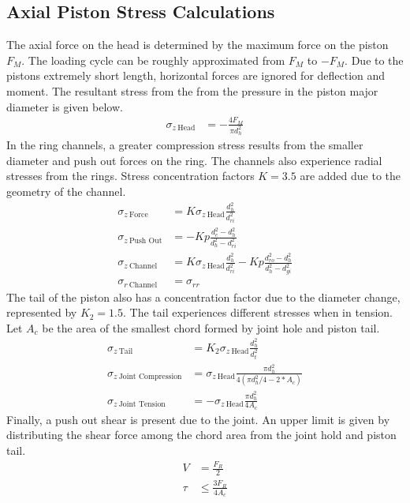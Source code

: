 \documentclass[10pt,a4paper]{article}
\begin{document}
	\subsection*{Axial Piston Stress Calculations}
	The axial force on the head is determined by the maximum force on the piston $F_M$. The loading cycle can be roughly approximated from $F_M$ to $-F_M$. Due to the pistons extremely short length, horizontal forces are ignored for deflection and moment. The resultant stress from the from the pressure in the piston major diameter is given below.
	\begin{align*}
		\sigma_{z\ \text{Head}} &= - \frac{4 F_M}{\pi d_h^2}
	\end{align*}
	In the ring channels, a greater compression stress results from the smaller diameter and push out forces on the ring. The channels also experience radial stresses from the rings. Stress concentration factors $K = 3.5$ are added due to the geometry of the channel.
	\begin{align*}
		\sigma_{z\ \text{Force}} &=  K \sigma_{z\ \text{Head}} \frac{d_h^2}{d_{ri}^2} \\
		\sigma_{z\ \text{Push Out}} &= - K p \frac{d_{c}^2 - d_h^2}{d_h^2 - d_{ri}^2}\\
		\sigma_{z\ \text{Channel}} &= K \sigma_{z\ \text{Head}} \frac{d_h^2}{d_{ri}^2} - K p \frac{d_{ro}^2 - d_h^2}{d_h^2 - d_{gi}^2}\\
		\sigma_{r\ \text{Channel}} &= \sigma_{r r}
	\end{align*}
	The tail of the piston also has a concentration factor due to the diameter change, represented by $K_2 = 1.5$. The tail experiences different stresses when in tension. Let $A_c$ be the area of the smallest chord formed by joint hole and piston tail.
	\begin{align*}
		\sigma_{z\ \text{Tail}} &= K_2 \sigma_{z\ \text{Head}} \frac{d_h^2}{d_t^2}\\
		\sigma_{z\ \text{Joint Compression}} &= \sigma_{z\ \text{Head}} \frac{\pi d_h^2}{4 (\pi d_h^2/4-2*A_c)}\\
		\sigma_{z\ \text{Joint Tension}} &= -\sigma_{z\ \text{Head}} \frac{\pi d_h^2}{4 A_c}
	\end{align*}
	Finally, a push out shear is present due to the joint. An upper limit is given by distributing the shear force among the chord area from the joint hold and piston tail.
	\begin{align*}
		V &= \frac{F_R}{2}\\
		\tau &\leq \frac{3 F_R}{4 A_c}
	\end{align*}
\end{document}
